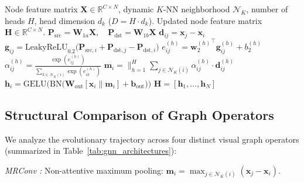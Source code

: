 \documentclass[]{interact}
\theoremstyle{plain}
\theoremstyle{definition}
\theoremstyle{remark}
\begin{document}
\begin{algorithm}[H]
\caption{Message Passing and Attention Computation in GATConv}
\label{alg:gatconv}
\begin{algorithmic}[1]
\Require Node feature matrix $\mathbf{X} \in \mathbb{R}^{C \times N}$, dynamic $K$-NN neighborhood $\mathcal{N}_K$, number of heads $H$, head dimension $d_k$ ($D = H \cdot d_k$).
\Ensure Updated node feature matrix $\mathbf{H} \in \mathbb{R}^{C \times N}$.
\State $\mathbf{P}_{\text{src}} = \mathbf{W}_{1a} \mathbf{X}, \quad \mathbf{P}_{\text{dst}} = \mathbf{W}_{1b} \mathbf{X}$ 
    \State $\mathbf{d}_{ij} = \mathbf{x}_j - \mathbf{x}_i$ 
    \State $\mathbf{g}_{ij} = \text{LeakyReLU}_{0.2}\big(\mathbf{P}_{\text{src}, i} + \mathbf{P}_{\text{dst}, j} - \mathbf{P}_{\text{dst}, i}\big)$ 
        \State $e_{ij}^{(h)} = {\mathbf{w}_2^{(h)}}^\top \mathbf{g}_{ij}^{(h)} + b_2^{(h)}$ 
        \State $\alpha_{ij}^{(h)} = \frac{\exp(e_{ij}^{(h)})}{\sum_{k \in \mathcal{N}_K(i)} \exp(e_{ik}^{(h)})}$ 
    \EndFor
    \State $\mathbf{m}_i = \Big\|_{h=1}^H \sum_{j \in \mathcal{N}_K(i)} \alpha_{ij}^{(h)} \cdot \mathbf{d}_{ij}^{(h)}$ 
    \State $\mathbf{h}_i = \text{GELU}\Big(\text{BN}\big(\mathbf{W}_{\text{out}}[\mathbf{x}_i \parallel \mathbf{m}_i] + \mathbf{b}_{\text{out}}\big)\Big)$ 
\EndFor
\State \Return $\mathbf{H} = [\mathbf{h}_1, \dots, \mathbf{h}_N]$
\end{algorithmic}
\end{algorithm}

\subsection{Structural Comparison of Graph Operators}
\label{sec:operator_comparison}

We analyze the evolutionary trajectory across four distinct visual graph operators (summarized in Table~\ref{tab:gnn_architectures}):

\textit{MRConv \citep{han2022vision}:} Non-attentive maximum pooling: $\mathbf{m}_i = \max_{j \in \mathcal{N}_K(i)} (\mathbf{x}_j - \mathbf{x}_i)$.
\end{document}
